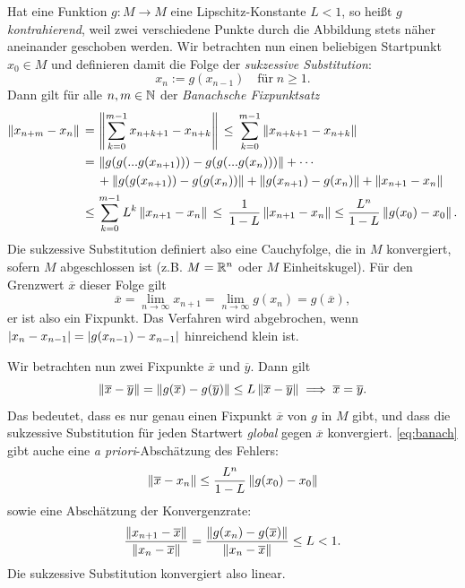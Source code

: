  Hat eine Funktion $g:M\to M$ eine
Lipschitz-Konstante $L<1$, so heißt $g$ \emph{kontrahierend}, weil
zwei verschiedene Punkte durch die Abbildung stets näher aneinander
geschoben werden. Wir betrachten nun einen beliebigen Startpunkt
$x_0\in M$ und definieren damit die Folge der \emph{sukzessive Substitution}:
\begin{equation}
  x_{n} := g(x_{n-1}) \quad\text{für}\; n\ge 1.
\end{equation}
Dann gilt für alle $n,m\in\mathbb{N}$ der \emph{Banachsche Fixpunktsatz}
\begin{align}
  \label{eq:banach}
  \left\lVert{x_{n+m} - x_n}\right\rVert \,=\, &\left\lVert{\sum_{k=0}^{m-1} x_{n+k+1} - x_{n+k}}\right\rVert
  \,\le\, \sum_{k=0}^{m-1} \left\lVert{x_{n+k+1} - x_{n+k}}\right\rVert\nonumber\\
  \,=\, &\left\lVert{g(g(...g(x_{n+1}))) - g(g(...g(x_{n})))}\right\rVert
  + \cdots\nonumber\\
  &+ \left\lVert{g(g(x_{n+1})) - g(g(x_{n}))}\right\rVert
  + \left\lVert{g(x_{n+1}) - g(x_{n})}\right\rVert + \left\lVert{x_{n+1} - x_{n}}\right\rVert\nonumber\\
  \le\, &\sum_{k=0}^{m-1} L^k \left\lVert{x_{n+1} - x_{n}}\right\rVert
  \,\le\, \frac{1}{1-L}\left\lVert{x_{n+1} - x_{n}}\right\rVert \le
  \frac{L^n}{1-L}\left\lVert{g(x_0) - x_0}\right\rVert.
\end{align}
Die sukzessive Substitution definiert also eine Cauchyfolge, die in
$M$ konvergiert, sofern $M$ abgeschlossen ist (z.B. $M=\mathbb{R}^n$ oder $M$
Einheitskugel). Für den Grenzwert $\overline{x}$ dieser Folge gilt
\begin{equation}
  \overline{x} = \lim_{n\to\infty}x_{n+1} = \lim_{n\to\infty}g(x_{n})
  = g(\overline{x}),
\end{equation}
er ist also ein Fixpunkt. Das Verfahren wird abgebrochen, wenn
$\left\lvert{x_n - x_{n-1}}\right\rvert = \left\lvert{g(x_{n-1}) - x_{n-1}}\right\rvert$ hinreichend klein
ist.

Wir betrachten nun zwei Fixpunkte $\overline{x}$ und $\overline{y}$. Dann gilt
\begin{equation}
  \left\lVert{\overline{x} - \overline{y}}\right\rVert = \left\lVert{g(\overline{x}) -
    g(\overline{y})}\right\rVert \le L \left\lVert{\overline{x} - \overline{y}}\right\rVert \implies
  \overline{x} = \overline{y}.
\end{equation}
Das bedeutet, dass es nur genau einen Fixpunkt $\overline{x}$ von $g$
in $M$ gibt, und dass die sukzessive Substitution für jeden Startwert
\emph{global} gegen $\overline{x}$ konvergiert. \eqref{eq:banach}
gibt auche eine \textit{a priori}-Abschätzung des Fehlers:
\begin{equation}
  \left\lVert{\overline{x} - x_n}\right\rVert \le \frac{L^n}{1-L}\left\lVert{g(x_0) - x_0}\right\rVert
\end{equation}
sowie eine Abschätzung der Konvergenzrate:
\begin{equation}
  \frac{\left\lVert{x_{n+1} - \overline{x}}\right\rVert}{\left\lVert{x_n - \overline{x}}\right\rVert}
  = \frac{\left\lVert{g(x_n) - g(\overline{x})}\right\rVert}{\left\lVert{x_n - \overline{x}}\right\rVert}
  \le L < 1.
\end{equation}
Die sukzessive Substitution konvergiert also linear.


